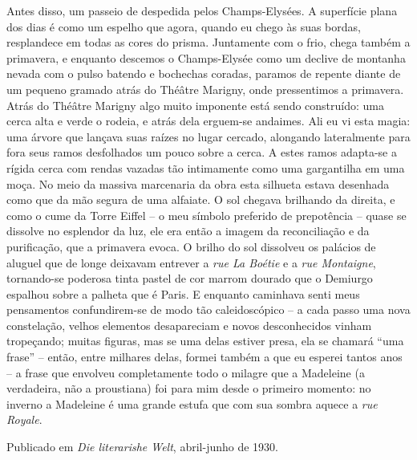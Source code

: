 Antes disso, um passeio de despedida pelos Champs-Elysées. A superfície
plana dos dias é como um espelho que agora, quando eu chego às suas
bordas, resplandece em todas as cores do prisma. Juntamente com o frio,
chega também a primavera, e enquanto descemos o Champs-Elysée como um
declive de montanha nevada com o pulso batendo e bochechas coradas,
paramos de repente diante de um pequeno gramado atrás do Théâtre
Marigny, onde pressentimos a primavera. Atrás do Théâtre Marigny algo
muito imponente está sendo construído: uma cerca alta e verde o rodeia,
e atrás dela erguem-se andaimes. Ali eu vi esta magia: uma árvore que
lançava suas raízes no lugar cercado, alongando lateralmente para fora
seus ramos desfolhados um pouco sobre a cerca. A estes ramos adapta-se a
rígida cerca com rendas vazadas tão intimamente como uma gargantilha em
uma moça. No meio da massiva marcenaria da obra esta silhueta estava
desenhada como que da mão segura de uma alfaiate. O sol chegava
brilhando da direita, e como o cume da Torre Eiffel -- o meu símbolo
preferido de prepotência -- quase se dissolve no esplendor da luz, ele
era então a imagem da reconciliação e da purificação, que a primavera
evoca. O brilho do sol dissolveu os palácios de aluguel que de longe
deixavam entrever a \emph{rue La Boétie} e a \emph{rue Montaigne},
tornando-se poderosa tinta pastel de cor marrom dourado que o Demiurgo
espalhou sobre a palheta que é Paris. E enquanto caminhava senti meus
pensamentos confundirem-se de modo tão caleidoscópico -- a cada passo
uma nova constelação, velhos elementos desapareciam e novos
desconhecidos vinham tropeçando; muitas figuras, mas se uma delas
estiver presa, ela se chamará ``uma frase'' -- então, entre milhares
delas, formei também a que eu esperei tantos anos -- a frase que
envolveu completamente todo o milagre que a Madeleine (a verdadeira, não
a proustiana) foi para mim desde o primeiro momento: no inverno a
Madeleine é uma grande estufa que com sua sombra aquece a \emph{rue
Royale}.

Publicado em \emph{Die literarishe Welt}, abril-junho de 1930.
